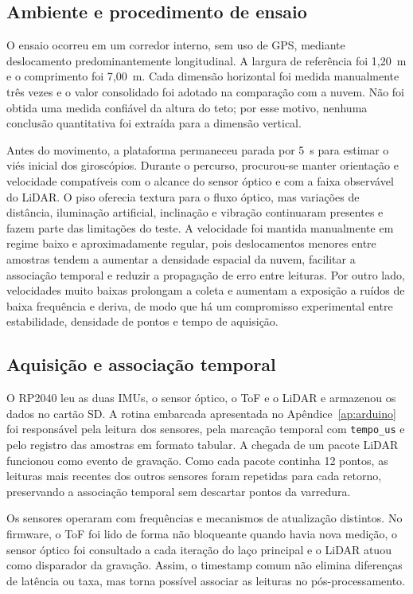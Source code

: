\subsection{Ambiente e procedimento de ensaio}

O ensaio ocorreu em um corredor interno, sem uso de GPS, mediante deslocamento predominantemente longitudinal. A largura de referência foi 1,20~m e o comprimento foi 7,00~m. Cada dimensão horizontal foi medida manualmente três vezes e o valor consolidado foi adotado na comparação com a nuvem. Não foi obtida uma medida confiável da altura do teto; por esse motivo, nenhuma conclusão quantitativa foi extraída para a dimensão vertical.

Antes do movimento, a plataforma permaneceu parada por 5~s para estimar o viés inicial dos giroscópios. Durante o percurso, procurou-se manter orientação e velocidade compatíveis com o alcance do sensor óptico e com a faixa observável do LiDAR. O piso oferecia textura para o fluxo óptico, mas variações de distância, iluminação artificial, inclinação e vibração continuaram presentes e fazem parte das limitações do teste. A velocidade foi mantida manualmente em regime baixo e aproximadamente regular, pois deslocamentos menores entre amostras tendem a aumentar a densidade espacial da nuvem, facilitar a associação temporal e reduzir a propagação de erro entre leituras. Por outro lado, velocidades muito baixas prolongam a coleta e aumentam a exposição a ruídos de baixa frequência e deriva, de modo que há um compromisso experimental entre estabilidade, densidade de pontos e tempo de aquisição.

\subsection{Aquisição e associação temporal}

O RP2040 leu as duas IMUs, o sensor óptico, o ToF e o LiDAR e armazenou os dados no cartão SD. A rotina embarcada apresentada no Apêndice~\ref{ap:arduino} foi responsável pela leitura dos sensores, pela marcação temporal com \texttt{tempo\_us} e pelo registro das amostras em formato tabular. A chegada de um pacote LiDAR funcionou como evento de gravação. Como cada pacote continha 12 pontos, as leituras mais recentes dos outros sensores foram repetidas para cada retorno, preservando a associação temporal sem descartar pontos da varredura.

Os sensores operaram com frequências e mecanismos de atualização distintos. No firmware, o ToF foi lido de forma não bloqueante quando havia nova medição, o sensor óptico foi consultado a cada iteração do laço principal e o LiDAR atuou como disparador da gravação. Assim, o timestamp comum não elimina diferenças de latência ou taxa, mas torna possível associar as leituras no pós-processamento.

